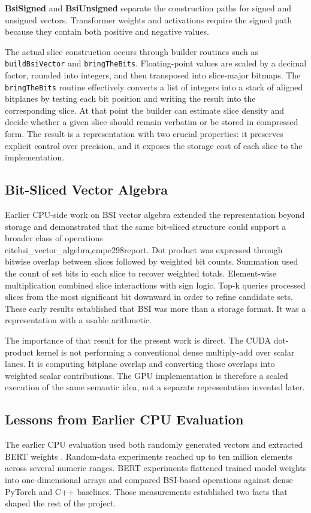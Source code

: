 \textbf{BsiSigned} and \textbf{BsiUnsigned} separate the construction paths for signed and unsigned vectors. Transformer weights and activations require the signed path because they contain both positive and negative values.

The actual slice construction occurs through builder routines such as \texttt{buildBsiVector} and \texttt{bringTheBits}. Floating-point values are scaled by a decimal factor, rounded into integers, and then transposed into slice-major bitmaps. The \texttt{bringTheBits} routine effectively converts a list of integers into a stack of aligned bitplanes by testing each bit position and writing the result into the corresponding slice. At that point the builder can estimate slice density and decide whether a given slice should remain verbatim or be stored in compressed form. The result is a representation with two crucial properties: it preserves explicit control over precision, and it exposes the storage cost of each slice to the implementation.

\subsection{Bit-Sliced Vector Algebra}
Earlier CPU-side work on BSI vector algebra extended the representation beyond storage and demonstrated that the same bit-sliced structure could support a broader class of operations \\cite{bsi_vector_algebra,cmpe298report}. Dot product was expressed through bitwise overlap between slices followed by weighted bit counts. Summation used the count of set bits in each slice to recover weighted totals. Element-wise multiplication combined slice interactions with sign logic. Top-k queries processed slices from the most significant bit downward in order to refine candidate sets. These early results established that BSI was more than a storage format. It was a representation with a usable arithmetic.

The importance of that result for the present work is direct. The CUDA dot-product kernel is not performing a conventional dense multiply-add over scalar lanes. It is computing bitplane overlap and converting those overlaps into weighted scalar contributions. The GPU implementation is therefore a scaled execution of the same semantic idea, not a separate representation invented later.

\subsection{Lessons from Earlier CPU Evaluation}
The earlier CPU evaluation used both randomly generated vectors and extracted BERT weights \cite{bert,cmpe298report}. Random-data experiments reached up to ten million elements across several numeric ranges. BERT experiments flattened trained model weights into one-dimensional arrays and compared BSI-based operations against dense PyTorch and C++ baselines. Those measurements established two facts that shaped the rest of the project.

